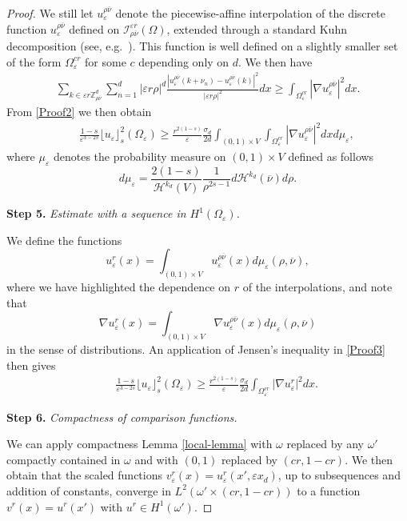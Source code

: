 \documentclass[11pt]{article}
\def\e{\varepsilon}
\begin{document}
\begin{proof}
\smallskip
We still let $u_\e^{\rho\overline{\nu}}$ denote the piecewise-affine interpolation of the discrete function $u_\e^{\rho\overline{\nu}}$ defined on $\mathcal{I}^{\e r}_{\rho\overline{\nu}}(\Omega)$, extended through a standard Kuhn decomposition (see, e.g.~\cite[Remark~6]{BBD}). This function is well defined on a slightly smaller set of the form $\Omega_\e^{cr}$ for some $c$ depending only on $d$. We then have
\begin{eqnarray*}\nonumber
\sum_{k\in \e r \mathbb Z^d_{\rho\overline{\nu}}}\sum_{n=1}^d|\e r\rho|^d\frac{|u_\e^{\rho\overline{\nu}}(k+\nu_n)-u_\e^{\rho\overline{\nu}}(k)|^2}{|\e r\rho|^2} dx\ge
 \int_{\Omega_\e^{cr}}|\nabla u_\e^{\rho\overline{\nu}}|^2dx.
\end{eqnarray*}
From \eqref{Proof2} we then obtain
\begin{eqnarray}\label{Proof3}
&&\frac{1-s}{\e^{3-2s}}\lfloor u_\e\rfloor_s^2(\Omega_\e)
\ge \frac{r^{2(1-s)}}\e\frac{\sigma_{d}}{2d}\int_{(0,1)\times V}\int_{\Omega_\e^{cr}}|\nabla u_\e^{\rho\overline{\nu}}|^2dxd\mu_\e,
\end{eqnarray}
where $\mu_\e$ denotes the probability measure on $(0,1)\times V$ defined as follows
$$ d\mu_\e=
\frac{2(1-s)}{\mathcal{H}^{k_d}(V)}  \frac{1}{\rho^{2s-1}} d\mathcal{H}^{k_d}(\overline{\nu}) d\rho.
$$


{\bf Step 5.} {\em Estimate with a sequence in $H^1(\Omega_\e)$.}

\smallskip
We define the functions
$$
u^r_\e(x)=\int_{(0,1)\times V}u_\e^{\rho\overline{\nu}}(x) d\mu_\e(\rho,\overline\nu),
$$
where we have highlighted the dependence on $r$ of the interpolations, and note that
$$
\nabla u^r_\e(x)=\int_{(0,1)\times V}\nabla u_\e^{\rho\overline{\nu}}(x) d\mu_\e(\rho,\overline\nu)
$$
 in the sense of distributions.
An application of Jensen's inequality in \eqref{Proof3} then gives
\begin{eqnarray}\label{Proof31}
&&\frac{1-s}{\e^{3-2s}}\lfloor u_\e\rfloor_s^2(\Omega_\e)
\ge \frac{r^{2(1-s)}}\e\frac{\sigma_{d}}{2d}\int_{\Omega_\e^{cr}}|\nabla u^r_\e|^2dx.
\end{eqnarray}

{\bf Step 6.} {\em Compactness of comparison functions.}

\smallskip
We can apply compactness Lemma \ref{local-lemma} with $\omega$ replaced by any $\omega'$ compactly contained in $\omega$ and with $(0,1)$ replaced by $(cr,1-cr)$. We then obtain that the scaled functions $v_\e^r(x)=u_\e^r(x',\e x_d)$, up to subsequences and addition of constants, converge in $L^2(\omega'\times(cr,1-cr))$ to a function $v^r(x)=u^r(x')$ with $u^r\in H^1(\omega')$.


\end{proof}
\end{document}
